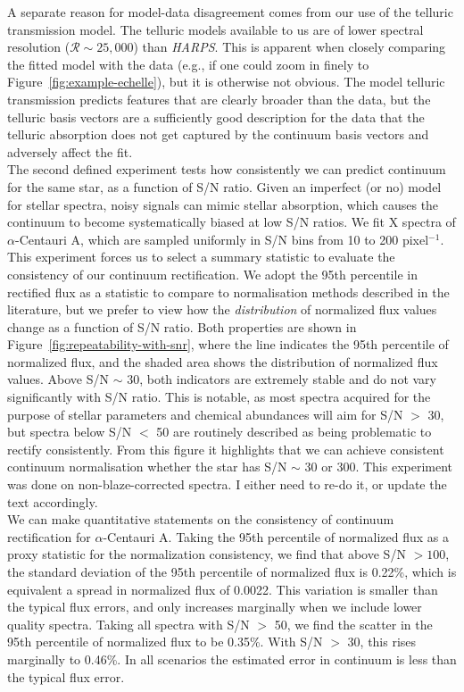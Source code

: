 \documentclass[modern]{aastex631}
\newcommand{\project}[1]{\textit{#1}}
\newcommand{\harps}{\project{HARPS}}
\newcommand{\todo}[1]{\textcolor{tab:red}{#1}}
\begin{document}
A separate reason for model-data disagreement comes from our use of the telluric transmission model. The telluric models available to us are of lower spectral resolution ($\mathcal{R} \sim 25{,}000$) than \harps. This is apparent when closely comparing the fitted model with the data (e.g., if one could zoom in finely to Figure~\ref{fig:example-echelle}), but it is otherwise not obvious. The model telluric transmission predicts features that are clearly broader than the data, but the telluric basis vectors are a sufficiently good description for the data that the telluric absorption does not get captured by the continuum basis vectors and adversely affect the fit.\\

The second defined experiment tests how consistently we can predict continuum for the same star, as a function of S/N ratio. Given an imperfect (or no) model for stellar spectra, noisy signals can mimic stellar absorption, which causes the continuum to become systematically biased at low S/N ratios. We fit \todo{X} spectra of $\alpha$-Centauri A, which are sampled uniformly in S/N bins from 10 to 200 pixel$^{-1}$. This experiment forces us to select a summary statistic to evaluate the consistency of our continuum rectification. We adopt the 95th percentile in rectified flux as a statistic to compare to normalisation methods described in the literature, but we prefer to view how the \emph{distribution} of normalized flux values change as a function of S/N ratio. Both properties are shown in Figure~\ref{fig:repeatability-with-snr}, where the line indicates the 95th percentile of normalized flux, and the shaded area shows the distribution of normalized flux values. Above S/N $\sim$ 30, both indicators are extremely stable and do not vary significantly with S/N ratio. This is notable, as most spectra acquired for the purpose of stellar parameters and chemical abundances will aim for S/N $>$ 30, but spectra below S/N $<$ 50 are routinely described as being problematic to rectify consistently. From this figure it highlights that we can achieve consistent continuum normalisation whether the star has S/N $\sim$ 30 or 300. \todo{This experiment was done on non-blaze-corrected spectra. I either need to re-do it, or update the text accordingly.}\\

We can make quantitative statements on the consistency of continuum rectification for $\alpha$-Centauri A. Taking the 95th percentile of normalized flux as a proxy statistic for the normalization consistency, we find that above S/N $> 100$, the standard deviation of the 95th percentile of normalized flux is 0.22\%, which is equivalent a spread in normalized flux of 0.0022. This variation is smaller than the typical flux errors, and only increases marginally when we include lower quality spectra. Taking all spectra with S/N $>$ 50, we find the scatter in the 95th percentile of normalized flux to be 0.35\%. With S/N $>$ 30, this rises marginally to 0.46\%. In all scenarios the estimated error in continuum is less than the typical flux error.\\
\end{document}
